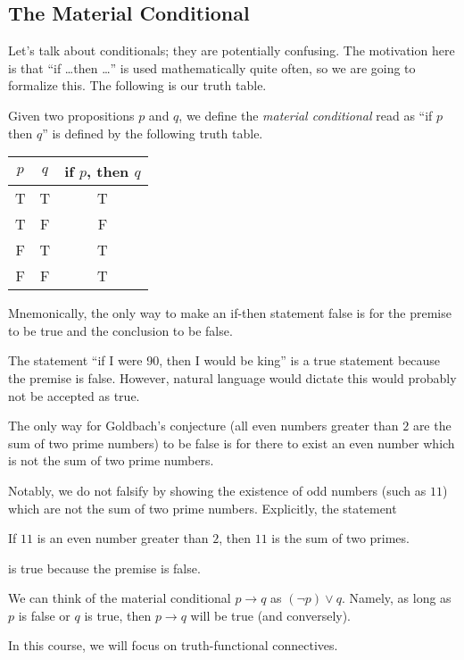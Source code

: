 \documentclass[../notes.tex]{subfiles}
\begin{document}
\subsection{The Material Conditional}
Let's talk about conditionals; they are potentially confusing. The motivation here is that ``if \ldots then \ldots'' is used mathematically quite often, so we are going to formalize this. The following is our truth table.
\begin{definition}
	Given two propositions $p$ and $q$, we define the \textit{material conditional} read as ``if $p$ then $q$'' is defined by the following truth table.
	\begin{center}
		\begin{tabular}{cc|c}
			$p$ & $q$ & if $p$, then $q$ \\\hline
			T & T & T \\
			T & F & F \\
			F & T & T \\
			F & F & T
		\end{tabular}
	\end{center}
\end{definition}
Mnemonically, the only way to make an if-then statement false is for the premise to be true and the conclusion to be false.
\begin{warn}
	The statement ``if I were 90, then I would be king'' is a true statement because the premise is false. However, natural language would dictate this would probably not be accepted as true.
\end{warn}
\begin{example}
	The only way for Goldbach's conjecture (all even numbers greater than $2$ are the sum of two prime numbers) to be false is for there to exist an even number which is not the sum of two prime numbers.
	
	Notably, we do not falsify by showing the existence of odd numbers (such as $11$) which are not the sum of two prime numbers. Explicitly, the statement
	\begin{center}
		If $11$ is an even number greater than $2$, then $11$ is the sum of two primes.
	\end{center}
	is true because the premise is false.
\end{example}
\begin{remark}
	We can think of the material conditional $p\to q$ as $(\lnot p)\lor q$. Namely, as long as $p$ is false or $q$ is true, then $p\to q$ will be true (and conversely).
\end{remark}
In this course, we will focus on truth-functional connectives.
\end{document}
